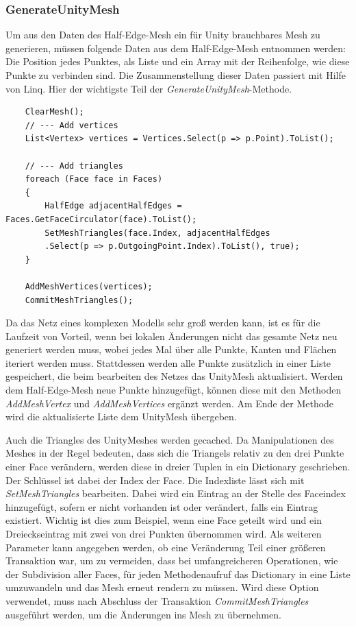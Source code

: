 \subsubsection{GenerateUnityMesh}
Um aus den Daten des Half-Edge-Mesh ein f\"ur Unity brauchbares Mesh zu generieren, m\"ussen folgende Daten aus dem Half-Edge-Mesh entnommen werden: Die Position jedes Punktes, als Liste und ein Array mit der Reihenfolge, wie diese Punkte zu verbinden sind. Die Zusammenstellung dieser Daten passiert mit Hilfe von Linq. Hier der wichtigste Teil der \textit{GenerateUnityMesh}-Methode.
\begin{lstlisting}
	ClearMesh();
	// --- Add vertices
	List<Vertex> vertices = Vertices.Select(p => p.Point).ToList();

	// --- Add triangles
	foreach (Face face in Faces)
	{
		HalfEdge adjacentHalfEdges = Faces.GetFaceCirculator(face).ToList();
		SetMeshTriangles(face.Index, adjacentHalfEdges
		.Select(p => p.OutgoingPoint.Index).ToList(), true);
	}

	AddMeshVertices(vertices);
	CommitMeshTriangles();
\end{lstlisting}
Da das Netz eines komplexen Modells sehr gro{\ss} werden kann, ist es f\"ur die Laufzeit von Vorteil, wenn bei lokalen \"Anderungen nicht das gesamte Netz neu generiert werden muss, wobei jedes Mal \"uber alle Punkte, Kanten und Fl\"achen iteriert werden muss. Stattdessen werden alle Punkte zus\"atzlich in einer Liste gespeichert, die beim bearbeiten des Netzes das UnityMesh aktualisiert. Werden dem Half-Edge-Mesh neue Punkte hinzugef\"ugt, k\"onnen diese mit den Methoden \textit{AddMeshVertex} und \textit{AddMeshVertices} erg\"anzt werden. Am Ende der Methode wird die aktualisierte Liste dem UnityMesh \"ubergeben. 

Auch die Triangles des UnityMeshes werden gecached. Da Manipulationen des Meshes in der Regel bedeuten, dass sich die Triangels relativ zu den drei Punkte einer Face ver\"andern, werden diese in dreier Tuplen in ein Dictionary geschrieben. Der Schl\"ussel ist dabei der Index der Face. Die Indexliste l\"asst sich mit \textit{SetMeshTriangles} bearbeiten. Dabei wird ein Eintrag an der Stelle des Faceindex hinzugef\"ugt, sofern er nicht vorhanden ist oder ver\"andert, falls ein Eintrag existiert. Wichtig ist dies zum Beispiel, wenn eine Face geteilt wird und ein Dreieckseintrag mit zwei von drei Punkten \"ubernommen wird. Als weiteren Parameter kann angegeben werden, ob eine Ver\"anderung Teil einer gr\"o{\ss}eren Transaktion war, um zu vermeiden, dass bei umfangreicheren Operationen, wie der Subdivision aller Faces, f\"ur jeden Methodenaufruf das Dictionary in eine Liste umzuwandeln und das Mesh erneut rendern zu m\"ussen. Wird diese Option verwendet, muss nach Abschluss der Transaktion \textit{CommitMeshTriangles} ausgef\"uhrt werden, um die \"Anderungen ins Mesh zu \"ubernehmen.

